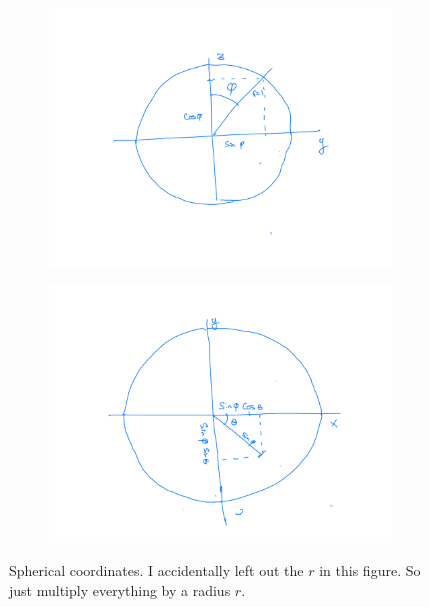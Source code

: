 \documentclass{book}
\begin{document}
\begin{figure}[h]

     \centering
     \begin{subfigure}[b]{0.4\textwidth}
         \centering
         \includegraphics[width=\textwidth]{change_of_variables/spherical-coords1.jpeg}
         \caption{}
     \end{subfigure}
     \begin{subfigure}[b]{0.4\textwidth}
         \centering
         \includegraphics[width=\textwidth]{change_of_variables/spherical-coords2.jpeg}
         \caption{}
         \label{fig:three sin x}
     \end{subfigure}
        \caption{Spherical coordinates. I accidentally left out the $r$ in this figure. So just multiply everything by a radius $r$.}
        \label{fig:spherical-coords}
\end{figure}
\end{document}
